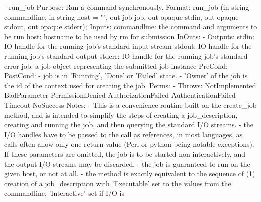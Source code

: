 \begin{myspec}
               
    - run_job  
      Purpose:  Run a command synchronously.
      Format:   run_job           (in  string  commandline,
                                   in  string  host = "",
                                   out job     job, 
                                   out opaque  stdin,
                                   out opaque  stdout,
                                   out opaque  stderr);
      Inputs:   commandline:       the command and arguments
                                   to be run
                host:              hostname to be used by rm for
                                   submission
      InOuts:   -
      Outputs:  stdin:             IO handle for the running
                                   job's standard input stream
                stdout:            IO handle for the running
                                   job's standard output
                stderr:            IO handle for the running
                                   job's standard error
                job:               a job object representing
                                   the submitted job instance
      PreCond:  -
      PostCond: - job is in 'Running', 'Done' or 'Failed' state.
                - 'Owner' of the job is the id of the context
                  used for creating the job.
      Perms:    - 
      Throws:   NotImplemented
                BadParameter
                PermissionDenied
                AuthorizationFailed
                AuthenticationFailed
                Timeout
                NoSuccess
      Notes:    - This is a convenience routine built on the
                  create_job method, and is intended to simplify
                  the steps of creating a job_description,
                  creating and running the job, and then
                  querying the standard I/O streams.
                - the I/O handles have to be passed to the call
                  as references, in most languages, as calls
                  often allow only one return value (Perl or
                  python being notable exceptions).  If these
                  parameters are omitted, the job is to be
                  started non-interactively, and the output I/O
                  streams may be discarded.
                - the job is guaranteed to run on the given
                  host, or not at all.
                - the method is exactly equivalent to the
                  sequence of (1) creation of a job_description
                  with 'Executable' set to the values from the
                  commandline, 'Interactive' set if I/O is

\end{myspec}

